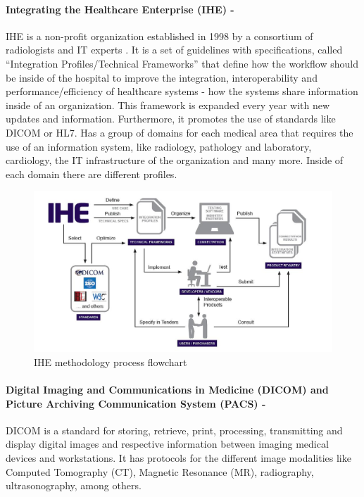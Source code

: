\documentclass[mim_thesis.tex]{subfiles}
\begin{document}
\paragraph{\textbf{Integrating the Healthcare Enterprise (IHE) -}}
IHE is a non-profit organization established in 1998 by a consortium of radiologists and IT experts \citep{IHE2018}. It is a set of guidelines with specifications, called “Integration Profiles/Technical Frameworks” that define how the workflow should be inside of the hospital to improve the integration, interoperability and performance/efficiency of healthcare systems - how the systems share information inside of an organization. This framework is expanded every year with new updates and information. Furthermore, it promotes the use of standards like DICOM or HL7. Has a group of domains for each medical area that requires the use of an information system, like radiology, pathology and laboratory, cardiology, the IT infrastructure of the organization and many more. Inside of each domain there are different profiles. 

\begin{figure}[H]
	\centering
    \includegraphics[width=1\textwidth]{img/IHE_process_flowchart.jpg}
	\caption{IHE methodology process flowchart}
	\label{fig:IHE_process_flowchart}
\end{figure}


\paragraph{\textbf{Digital Imaging and Communications in Medicine (DICOM) and Picture Archiving Communication System (PACS) -}}
DICOM is a standard for storing, retrieve, print, processing, transmitting and display digital images and respective information between imaging medical devices and workstations. It has protocols for the different image modalities like Computed Tomography (CT), Magnetic Resonance (MR), radiography, ultrasonography, among others.\\
\end{document}
